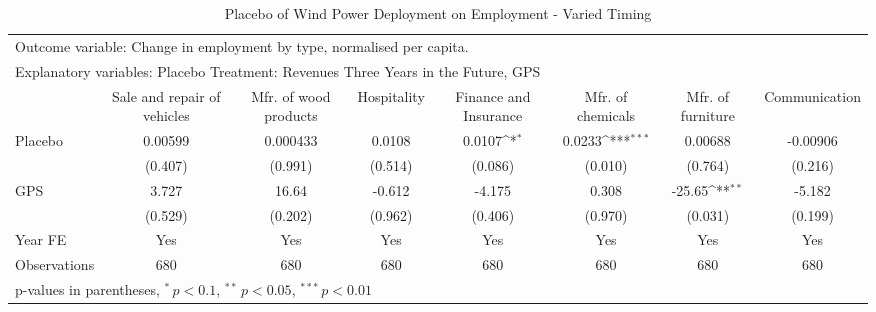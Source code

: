 \begin{table}[htbp]\centering
\def\sym#1{\ifmmode^{#1}\else\(^{#1}\)\fi}
\caption{Placebo of Wind Power Deployment on Employment - Varied Timing \label{employmentplacebo3}}
\begin{tabular*}{\hsize}{@{\hskip\tabcolsep\extracolsep\fill}l*{7}{c}}
\toprule
\multicolumn{7}{l}{\parbox{11cm}{Outcome variable: Change in employment by type, normalised per capita. }} \\ \multicolumn{7}{l}{\parbox{11cm}{Explanatory variables: Placebo Treatment: Revenues Three Years in the Future, GPS}} \\ \midrule & Sale and repair of vehicles & Mfr. of wood products & Hospitality & Finance and Insurance & Mfr. of chemicals & Mfr. of furniture & Communication \\ \midrule
\addlinespace Placebo&     0.00599         &    0.000433         &      0.0108         &      0.0107\sym{*}  &      0.0233\sym{***}&     0.00688         &    -0.00906         \\
            &     (0.407)         &     (0.991)         &     (0.514)         &     (0.086)         &     (0.010)         &     (0.764)         &     (0.216)         \\\addlinespace
GPS         &       3.727         &       16.64         &      -0.612         &      -4.175         &       0.308         &      -25.65\sym{**} &      -5.182         \\
            &     (0.529)         &     (0.202)         &     (0.962)         &     (0.406)         &     (0.970)         &     (0.031)         &     (0.199)         \\\addlinespace
\midrule
\addlinespace Year FE&         Yes         &         Yes         &         Yes         &         Yes         &         Yes         &         Yes         &         Yes         \\
\addlinespace \midrule \addlinespace Observations&         680         &         680         &         680         &         680         &         680         &         680         &         680         \\
\bottomrule
\multicolumn{8}{l}{\footnotesize p-values in parentheses, $^{*}\, p<0.1$, $^{**}\, p<0.05$, $^{***}\, p<0.01$}\\
\end{tabular*}
\end{table}
